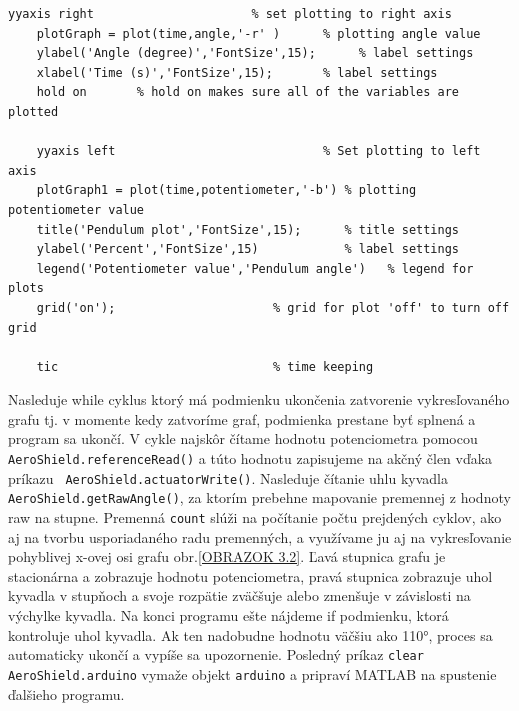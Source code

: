 \begin{lstlisting}[caption={AeroShield open loop grafy.},captionpos=b]
	yyaxis right                      % set plotting to right axis 
	plotGraph = plot(time,angle,'-r' )      % plotting angle value
	ylabel('Angle (degree)','FontSize',15);      % label settings
	xlabel('Time (s)','FontSize',15);       % label settings
	hold on       % hold on makes sure all of the variables are plotted
	
	yyaxis left                             % Set plotting to left axis
	plotGraph1 = plot(time,potentiometer,'-b') % plotting potentiometer value
	title('Pendulum plot','FontSize',15);      % title settings   
	ylabel('Percent','FontSize',15)            % label settings
	legend('Potentiometer value','Pendulum angle')   % legend for plots
	grid('on');                      % grid for plot 'off' to turn off grid
	
	tic                              % time keeping
\end{lstlisting}

Nasleduje while cyklus ktorý má podmienku ukončenia zatvorenie vykresľovaného grafu tj. v momente kedy zatvoríme graf, podmienka prestane byť splnená a program sa ukončí. V cykle najskôr čítame hodnotu potenciometra pomocou \verb|AeroShield.referenceRead()| a túto hodnotu zapisujeme na akčný člen vďaka príkazu \verb| AeroShield.actuatorWrite()|. Nasleduje čítanie uhlu kyvadla \verb|AeroShield.getRawAngle()|, za ktorím prebehne mapovanie premennej z hodnoty raw na stupne. Premenná \verb|count| slúži na počítanie počtu prejdených cyklov, ako aj na tvorbu usporiadaného radu premenných, a využívame ju aj na vykresľovanie pohyblivej x-ovej osi grafu obr.\ref{OBRAZOK 3.2}. Ľavá stupnica grafu je stacionárna a zobrazuje hodnotu potenciometra, pravá stupnica zobrazuje uhol kyvadla v stupňoch a svoje rozpätie zväčšuje alebo zmenšuje v závislosti na výchylke kyvadla. Na konci programu ešte nájdeme if podmienku, ktorá kontroluje uhol kyvadla. Ak ten nadobudne hodnotu väčšiu ako 110°, proces sa automaticky ukončí a vypíše sa upozornenie. Posledný príkaz \verb|clear AeroShield.arduino| vymaže objekt \verb|arduino| a pripraví MATLAB na spustenie ďalšieho programu. 

